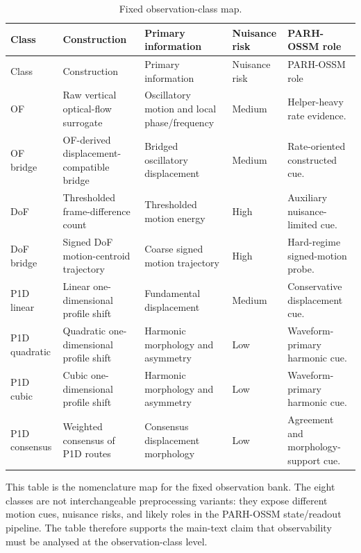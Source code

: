\documentclass[10pt]{article}
\begin{document}
\begin{longtable}{L{1.65cm}L{3.0cm}L{2.75cm}L{2.45cm}L{3.20cm}}
\caption{Fixed observation-class map.}\\
\toprule
Class & Construction & Primary information & Nuisance risk & PARH-OSSM role \\
\midrule
\endfirsthead
\toprule
Class & Construction & Primary information & Nuisance risk & PARH-OSSM role \\
\midrule
\endhead
OF & Raw vertical optical-flow surrogate & Oscillatory motion and local phase/frequency & Medium & Helper-heavy rate evidence. \\
OF bridge & OF-derived displacement-compatible bridge & Bridged oscillatory displacement & Medium & Rate-oriented constructed cue. \\
DoF & Thresholded frame-difference count & Thresholded motion energy & High & Auxiliary nuisance-limited cue. \\
DoF bridge & Signed DoF motion-centroid trajectory & Coarse signed motion trajectory & High & Hard-regime signed-motion probe. \\
P1D linear & Linear one-dimensional profile shift & Fundamental displacement & Medium & Conservative displacement cue. \\
P1D quadratic & Quadratic one-dimensional profile shift & Harmonic morphology and asymmetry & Low & Waveform-primary harmonic cue. \\
P1D cubic & Cubic one-dimensional profile shift & Harmonic morphology and asymmetry & Low & Waveform-primary harmonic cue. \\
P1D consensus & Weighted consensus of P1D routes & Consensus displacement morphology & Low & Agreement and morphology-support cue. \\
\bottomrule
\end{longtable}

This table is the nomenclature map for the fixed observation bank. The eight
classes are not interchangeable preprocessing variants: they expose different
motion cues, nuisance risks, and likely roles in the PARH-OSSM state/readout
pipeline. The table therefore supports the main-text claim that observability
must be analysed at the observation-class level.
\end{document}
